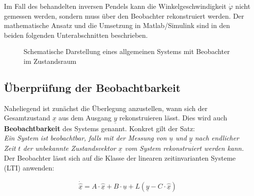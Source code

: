 Im Fall des behandelten inversen Pendels kann die Winkelgeschwindigkeit $\dot{\varphi}$ nicht gemessen werden, sondern muss über den Beobachter rekonstruiert werden. Der mathematische Ansatz und die Umsetzung in Matlab/Simulink sind in den beiden folgenden Unterabschnitten beschrieben.

\begin{figure}[H]
    \centering
    \caption[System mit Beobachter]{Schematische Darstellung eines allgemeinen Systems mit Beobachter im Zustandsraum}
    \label{fig:Bild44}
\end{figure}

\subsection{Überprüfung der Beobachtbarkeit}

Naheliegend ist zunächst die Überlegung anzustellen, wann sich der Gesamtzustand $\underline{x}$ aus dem Ausgang $\underline{y}$ rekonstruieren lässt. Dies wird auch \textbf{Beobachtbarkeit} des Systems genannt. Konkret gilt der Satz: \\
\newline
\textit{Ein System ist beobachtbar, falls mit der Messung von $\underline{u}$ und $\underline{y}$ nach endlicher Zeit $t$ der unbekannte Zustandsvektor $\underline{x}$ vom System rekonstruiert werden kann.} \\
\newline
Der Beobachter lässt sich auf die Klasse der linearen zeitinvarianten Systeme (LTI) anwenden:

\begin{align}
    \underline{\dot{\hat{x}}} = A \cdot \underline{\hat{x}} + B \cdot \underline{u} + L \left( \underline{y} - C \cdot \underline{\hat{x}}\right)
\end{align}

